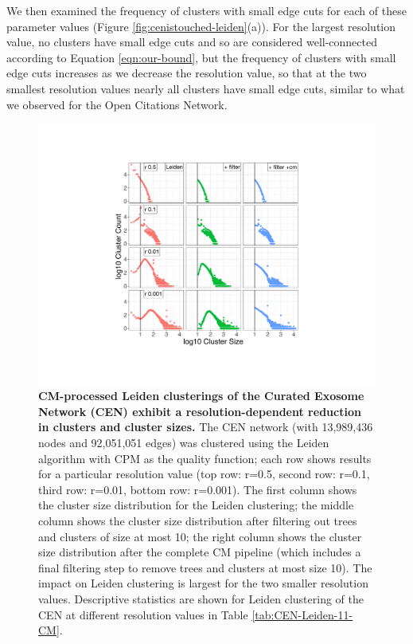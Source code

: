 \documentclass[11pt]{article}   	%
\begin{document}
We then examined the frequency of   clusters with small edge cuts for each of these parameter values (Figure \ref{fig:cenistouched-leiden}(a)).
For the largest resolution value, no clusters have small edge cuts and so are considered  well-connected according to Equation \ref{eqn:our-bound}, but the frequency of clusters with small edge cuts increases as we decrease the resolution value, so that at the two smallest resolution values nearly all clusters have small edge cuts, similar to what we observed for the Open Citations Network.

\begin{figure}[H]
\centering
\includegraphics[width=0.8\linewidth]{figs/fig2_kn.pdf}
\caption{\textbf{CM-processed Leiden clusterings of the Curated Exosome Network (CEN) exhibit a resolution-dependent reduction in clusters and cluster sizes.}
The CEN network (with 13,989,436 nodes and 92,051,051 edges) was clustered using the Leiden algorithm with CPM as the quality function; each row shows results for a particular resolution value (top row: r=0.5, second row: r=0.1, third row: r=0.01, bottom row: r=0.001).
The first column shows the cluster size distribution for the Leiden clustering; the middle column shows the cluster size distribution after filtering out trees and clusters of size at most 10; the right column shows the cluster size distribution after the complete CM pipeline (which includes a final filtering step to remove trees and clusters at most size 10).
The impact on Leiden clustering is largest for the two smaller resolution values. Descriptive statistics are shown for Leiden clustering of the CEN at different resolution values in Table \ref{tab:CEN-Leiden-11-CM}.}
\label{fig:CEN_size_count_plots_leiden}
\end{figure}
\end{document}

